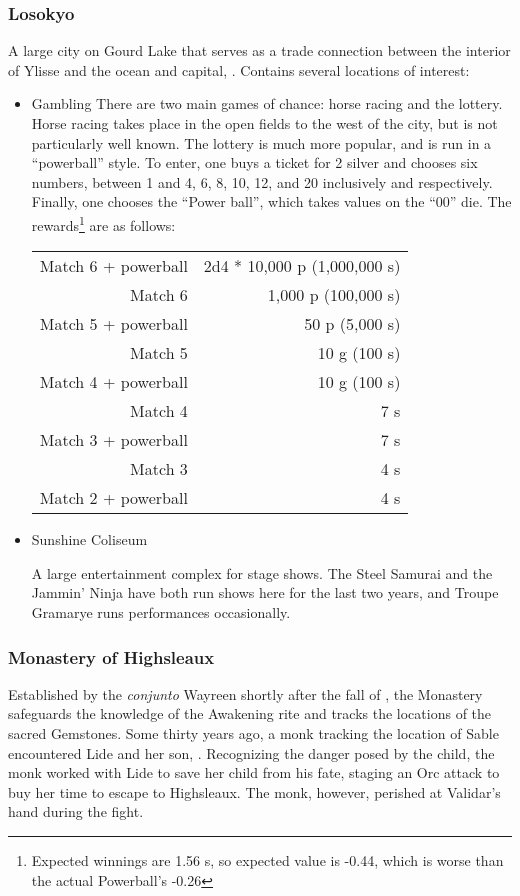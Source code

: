 \subsubsection{Losokyo}
\label{places:losokyo}
A large city on Gourd Lake that serves as a trade connection between the interior of Ylisse and the ocean and capital, . Contains several locations of interest:
\begin{itemize}
\item Gambling
There are two main games of chance: horse racing and the lottery. Horse racing takes place in the open fields to the west of the city, but is not particularly well known. The lottery is much more popular, and is run in a ``powerball'' style. To enter, one buys a ticket for 2 silver and chooses six numbers, between 1 and 4, 6, 8, 10, 12, and 20 inclusively and respectively. Finally, one chooses the ``Power ball'', which takes values on the ``00'' die. The rewards\footnote{Expected winnings are 1.56 s, so expected value is -0.44, which is worse than the actual Powerball's -0.26} are as follows:
\begin{tabular}{r r}
Match 6 + powerball & 2d4 * 10,000 p (1,000,000 s) \\
Match 6 & 1,000 p (100,000 s) \\
Match 5 + powerball & 50 p (5,000 s) \\
Match 5 & 10 g (100 s) \\
Match 4 + powerball & 10 g (100 s) \\
Match 4 & 7 s \\
Match 3 + powerball & 7 s\\
Match 3 & 4 s \\
Match 2 + powerball & 4 s\end{tabular}

\item Sunshine Coliseum

A large entertainment complex for stage shows. The Steel Samurai and the Jammin' Ninja have both run shows here for the last two years, and Troupe Gramarye runs performances occasionally.
\end{itemize}


\subsubsection{Monastery of Highsleaux}
\label{places:highsleaux}
Established by the \textit{conjunto} Wayreen shortly after the fall of , the Monastery safeguards the knowledge of the Awakening rite and tracks the locations of the sacred Gemstones. Some thirty years ago, a monk tracking the location of Sable encountered Lide and her son, . Recognizing the danger posed by the child, the monk worked with Lide to save her child from his fate, staging an Orc attack to buy her time to escape to Highsleaux. The monk, however, perished at Validar's hand during the fight.

